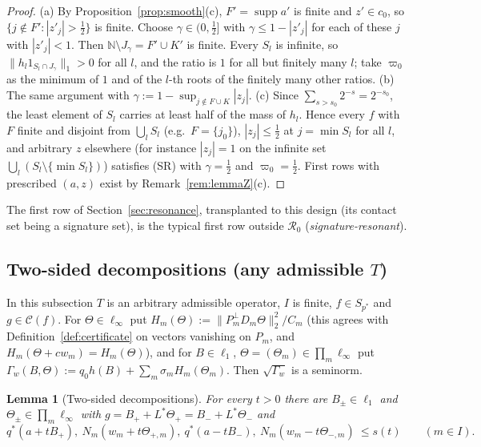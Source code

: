 \documentclass[10pt]{amsart}
\newtheorem{lemma}[theorem]{Lemma}
\theoremstyle{definition}
\theoremstyle{remark}
\newcommand{\supp}{\operatorname{supp}}
\newcommand{\N}{\mathbb N}
\newcommand{\Cset}{\mathcal C}
\begin{document}
\begin{proof}
(a) By Proposition~\ref{prop:smooth}(c), $F'=\supp a'$ is finite and
$z'\in c_0$, so $\{j\notin F':|z'_j|>\frac12\}$ is finite.  Choose
$\gamma\in(0,\frac12]$ with $\gamma\le1-|z'_j|$ for each of these $j$ with
$|z'_j|<1$.  Then $\N\setminus J_\gamma=F'\cup K'$ is finite.  Every $S_l$
is infinite, so $\|h_l1_{S_l\cap J_\gamma}\|_1>0$ for all $l$, and the
ratio is $1$ for all but finitely many $l$; take $\varpi_0$ as the
minimum of $1$ and of the $l$-th roots of the finitely many other ratios.
(b) The same argument with $\gamma:=1-\sup_{j\notin F\cup K}|z_j|$.
(c) Since $\sum_{s>s_0}2^{-s}=2^{-s_0}$, the least element of $S_l$ carries
at least half of the mass of $h_l$.  Hence every $f$ with $F$ finite and
disjoint from $\bigcup_lS_l$ (e.g.\ $F=\{j_0\}$),
$|z_j|\le\frac12$ at $j=\min S_l$ for all $l$, and arbitrary $z$
elsewhere (for instance $|z_j|=1$ on the infinite set
$\bigcup_l(S_l\setminus\{\min S_l\})$) satisfies (SR) with $\gamma=\frac12$
and $\varpi_0=\frac12$.  First rows with prescribed $(a,z)$ exist by
Remark~\ref{rem:lemmaZ}(c).
\end{proof}

The first row of Section~\ref{sec:resonance}, transplanted to this design
(its contact set being a signature set), is the typical first row outside
$\mathcal R_0$ (\emph{signature-resonant}).

\subsection{Two-sided decompositions (any admissible $T$)}
In this subsection $T$ is an arbitrary admissible operator, $I$ is finite,
$f\in S_{p^*}$ and $g\in\Cset(f)$.  For $\Theta\in\ell_\infty$ put
$H_m(\Theta):=\|P_m^\perp D_m\Theta\|_2^2/C_m$ (this agrees with
Definition~\ref{def:certificate} on vectors vanishing on $P_m$, and
$H_m(\Theta+cw_m)=H_m(\Theta)$), and for $B\in\ell_1$,
$\Theta=(\Theta_m)\in\prod_m\ell_\infty$ put $\Gamma_w(B,\Theta):=q_0h(B)+
\sum_m\sigma_mH_m(\Theta_m)$.  Then $\sqrt{\Gamma_w}$ is a seminorm.

\begin{lemma}[Two-sided decompositions]\label{lem:twosided}
For every $t>0$ there are $B_\pm\in\ell_1$ and $\Theta_\pm\in\prod_m
\ell_\infty$ with $g=B_++L^*\Theta_+=B_-+L^*\Theta_-$ and
\[
 q^*(a+tB_+),\ N_m(w_m+t\Theta_{+,m}),\ q^*(a-tB_-),\ N_m(w_m-t\Theta_{-,m})
 \ \le s(t)\qquad(m\in I).
\]
\end{lemma}
\end{document}
